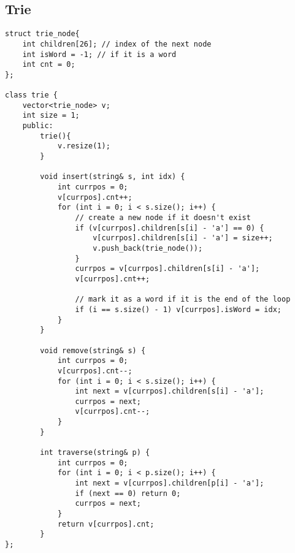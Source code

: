 \subsection{Trie}
\begin{lstlisting}
struct trie_node{
    int children[26]; // index of the next node
    int isWord = -1; // if it is a word
    int cnt = 0;
};

class trie {
    vector<trie_node> v;
    int size = 1;
    public:
        trie(){
            v.resize(1);
        }

        void insert(string& s, int idx) {
            int currpos = 0;
            v[currpos].cnt++;
            for (int i = 0; i < s.size(); i++) {
                // create a new node if it doesn't exist
                if (v[currpos].children[s[i] - 'a'] == 0) { 
                    v[currpos].children[s[i] - 'a'] = size++;
                    v.push_back(trie_node());
                }
                currpos = v[currpos].children[s[i] - 'a'];
                v[currpos].cnt++;
                
                // mark it as a word if it is the end of the loop
                if (i == s.size() - 1) v[currpos].isWord = idx;
            }
        }

        void remove(string& s) {
            int currpos = 0;
            v[currpos].cnt--;
            for (int i = 0; i < s.size(); i++) {
                int next = v[currpos].children[s[i] - 'a'];
                currpos = next;
                v[currpos].cnt--;
            }
        }

        int traverse(string& p) {
            int currpos = 0;
            for (int i = 0; i < p.size(); i++) {
                int next = v[currpos].children[p[i] - 'a'];
                if (next == 0) return 0;
                currpos = next;
            }
            return v[currpos].cnt;
        }
};
\end{lstlisting}
